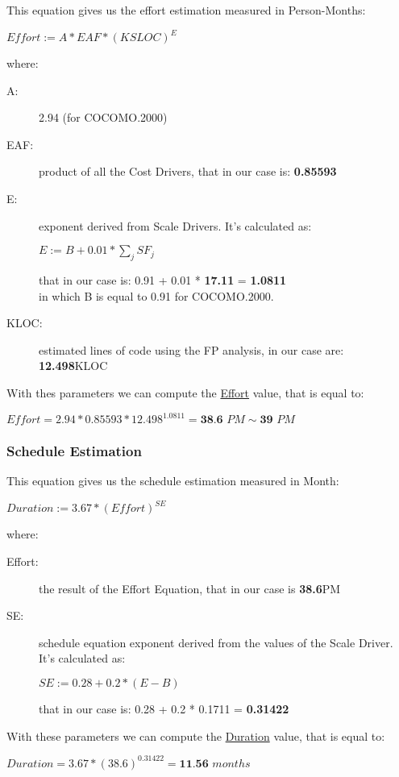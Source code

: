 This equation gives us the effort estimation measured in Person-Months:
\begin{center}
	$ Effort := A * EAF * (KSLOC)^{E} $
\end{center}
where:
\begin{description}
	\item [A:] {2.94 (for COCOMO.2000) }
	\item [EAF:] {product of all the Cost Drivers, that in our case is: \textbf{0.85593}} 
	\item [E:] {exponent derived from Scale Drivers. It's calculated as:
		\begin{center}
			$ E := B + 0.01 * \sum_{j} SF_{j} $
		\end{center}
		that in our case is: 0.91 + 0.01 * \textbf{17.11} = \textbf{1.0811}\\ in which B is equal to 0.91 for COCOMO.2000.}
	\item [KLOC:] {estimated lines of code using the FP analysis, in our case are: \textbf{12.498}KLOC}
\end{description}
With thes parameters we can compute the \underline{Effort} value, that is equal to:
\begin{center}
	$ Effort = 2.94 * 0.85593 * 12.498^{1.0811} = \textbf{38.6 } PM \sim \textbf{39 } PM $
\end{center}

\vfill
\subsubsection{Schedule Estimation}

This equation gives us the schedule estimation measured in Month:
\begin{center}
	$ Duration := 3.67 * (Effort)^{SE}$ 
\end{center}
where: 
\begin{description}
	\item [Effort:] {the result of the Effort Equation, that in our case is \textbf{38.6}PM }
	\item [SE:] {schedule equation exponent derived from the values of the Scale Driver. It's calculated as:
		\begin{center}
			$ SE := 0.28 + 0.2 * (E - B) $
		\end{center}
	that in our case is: 0.28 + 0.2 * 0.1711 = \textbf{0.31422} }
\end{description}
With these parameters we can compute the \underline{Duration} value, that is equal to:
\begin{center}
	$ Duration = 3.67 * (38.6)^{0.31422} = \textbf{11.56 } months $ \\
\end{center}
